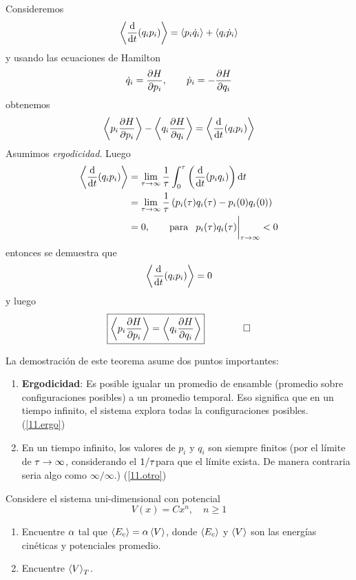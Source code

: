 \begin{dem}
	Consideremos
	\begin{equation}
  \ev{\dv{t}(q_ip_i)}=\ev{p_i\dot{q}_i}+\ev{q_i\dot{p}_i}
\end{equation}
y usando las ecuaciones de Hamilton
\begin{equation}
  \dot{q}_i=\pdv{H}{p_i},\qquad \dot{p}_i=-\pdv{H}{q_i}
\end{equation}
obtenemos
\begin{equation}
  \ev{p_i\pdv{H}{p_i}}-\ev{q_i\pdv{H}{q_i}}=\ev{\dv{t}(q_ip_i)}
\end{equation}
Asumimos \textit{ergodicidad}. Luego
\begin{align}
  \ev{\dv{t}(q_ip_i)}&=\lim_{\t\to\infty}\frac{1}{\t }\int_0^\t \left(\dv{t}(p_iq_i)\right)\dd t\label{11.ergo}\\
  &=\lim_{\t\to\infty}\frac{1}{\t }\left(p_i(\t)q_i(\t)-p_i(0)q_i(0)\right)\\
  &=0,\qquad \text{para }\,  \eval{p_i(\t)q_i(\t)}_{\t\to\infty}<0\label{11.otro}
\end{align}
entonces se demuestra que
\begin{equation}
  \ev{\dv{t}(q_ip_i)}=0
\end{equation}
y luego
\begin{equation}
\boxed{  \ev{p_i\pdv{H}{p_i}}=\ev{q_i\pdv{H}{q_i}}}\qquad \qed
\end{equation}
\end{dem}

La demostración de este teorema asume dos puntos importantes:
\begin{enumerate}
	\item \textbf{Ergodicidad}: Es posible igualar un promedio de ensamble (promedio sobre configuraciones posibles) a un promedio temporal. Eso significa que en un tiempo infinito, el sistema explora todas la configuraciones posibles. (\eqref{11.ergo})
	\item En un tiempo infinito, los valores de $p_i$ y $q_i$ son siempre finitos (por el límite de $\tau\to\infty$, considerando el $1/\tau $para que el límite exista. De manera contraria seria algo como $\infty/\infty$.) (\eqref{11.otro})
\end{enumerate}

\begin{ej}
	Considere el sistema uni-dimensional con potencial
	\begin{equation}
  V(x)=Cx^n,\quad n\geq 1
\end{equation}
\begin{enumerate}
	\item Encuentre $\alpha$ tal que $\ev{E_c}=\a\ev{V}$, donde $\ev{E_c}$ y $\ev{V}$ son las energías cinéticas y potenciales promedio.
	\item Encuentre $\ev{V}_T$.
\end{enumerate}
\end{ej}

